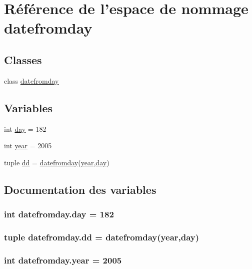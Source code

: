 \hypertarget{namespacedatefromday}{\section{Référence de l'espace de nommage datefromday}
\label{namespacedatefromday}
}
\subsection*{Classes}
\begin{DoxyCompactItemize}
\item 
class \hyperlink{classdatefromday_1_1datefromday}{datefromday}
\end{DoxyCompactItemize}
\subsection*{Variables}
\begin{DoxyCompactItemize}
\item 
int \hyperlink{namespacedatefromday_aede275c34345c420325ebc297aba81f9}{day} = 182
\item 
int \hyperlink{namespacedatefromday_a7919c99d6443529b833c52f4cfea8419}{year} = 2005
\item 
tuple \hyperlink{namespacedatefromday_a5f8d14af9c7da65685fd0496da5174eb}{dd} = \hyperlink{classdatefromday_1_1datefromday}{datefromday}(\hyperlink{namespacedatefromday_a7919c99d6443529b833c52f4cfea8419}{year},\hyperlink{namespacedatefromday_aede275c34345c420325ebc297aba81f9}{day})
\end{DoxyCompactItemize}


\subsection{Documentation des variables}
\hypertarget{namespacedatefromday_aede275c34345c420325ebc297aba81f9}{
\subsubsection[{day}]{\setlength{\rightskip}{0pt plus 5cm}int datefromday.\-day = 182}}\label{namespacedatefromday_aede275c34345c420325ebc297aba81f9}
\hypertarget{namespacedatefromday_a5f8d14af9c7da65685fd0496da5174eb}{
\subsubsection[{dd}]{\setlength{\rightskip}{0pt plus 5cm}tuple datefromday.\-dd = {\bf datefromday}({\bf year},{\bf day})}}\label{namespacedatefromday_a5f8d14af9c7da65685fd0496da5174eb}
\hypertarget{namespacedatefromday_a7919c99d6443529b833c52f4cfea8419}{
\subsubsection[{year}]{\setlength{\rightskip}{0pt plus 5cm}int datefromday.\-year = 2005}}\label{namespacedatefromday_a7919c99d6443529b833c52f4cfea8419}
